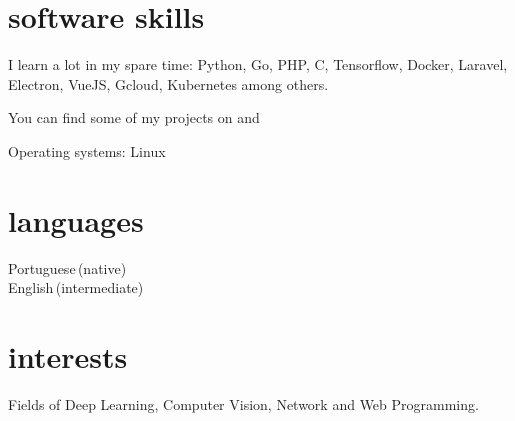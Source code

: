 \documentclass[]{cv-mauri}
\begin{document}
\section*{software skills}
    I learn a lot in my spare time: Python, Go, PHP, C, Tensorflow, Docker, Laravel, Electron, VueJS, Gcloud, Kubernetes among others.

    You can find some of my projects on \href{http://github.com/mauri870}{\color{maincolor}{http://github.com/mauri870}} and \href{http://mauri870.github.io}{\color{maincolor}{http://mauri870.github.io}}

    Operating systems: Linux \textcolor{red}{\faHeart}

\section*{languages}
\begin{tabularcv}
    Portuguese\,(native)\\[\vspacepar]
    English\,(intermediate)
\end{tabularcv}

\section*{interests}
    Fields of Deep Learning, Computer Vision, Network and Web Programming.
\end{document}
